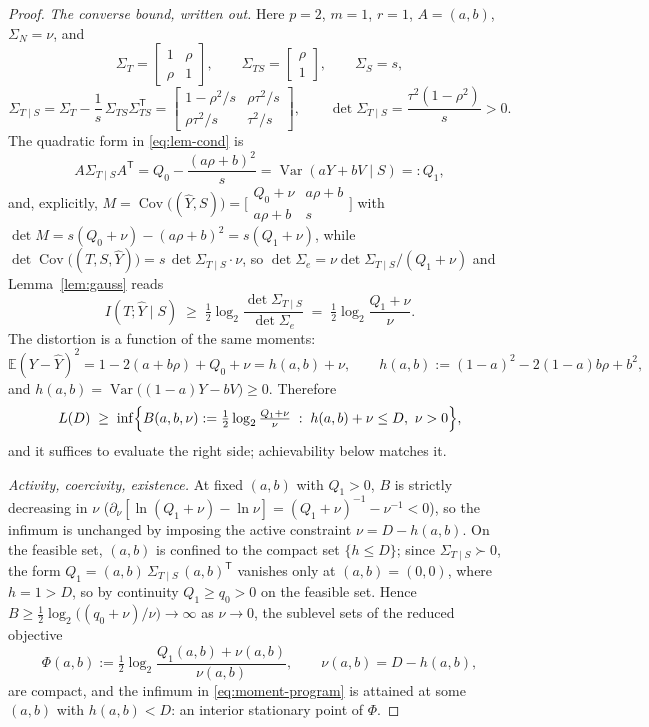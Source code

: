 ﻿\documentclass[11pt,onecolumn]{IEEEtran}
\newcommand{\E}{\mathbb{E}}
\newcommand{\Cov}{\operatorname{Cov}}
\newcommand{\hY}{\widehat{Y}}
\begin{document}
\begin{proof}
\emph{The converse bound, written out.} Here $p=2$, $m=1$, $r=1$,
$A=(a,b)$, $\Sigma_N=\nu$, and
\[
\Sigma_T=\begin{bmatrix}1&\rho\\ \rho&1\end{bmatrix},
\qquad
\Sigma_{TS}=\begin{bmatrix}\rho\\ 1\end{bmatrix},
\qquad
\Sigma_S=s,
\]
\[
\Sigma_{T\mid S}
=\Sigma_T-\frac1s\,\Sigma_{TS}\Sigma_{TS}^{\mathsf T}
=\begin{bmatrix}1-\rho^2/s&\rho\tau^2/s\\[2pt]
\rho\tau^2/s&\tau^2/s\end{bmatrix},
\qquad
\det\Sigma_{T\mid S}=\frac{\tau^2(1-\rho^2)}{s}>0 .
\]
The quadratic form in \eqref{eq:lem-cond} is
\[
A\Sigma_{T\mid S}A^{\mathsf T}
=Q_0-\frac{(a\rho+b)^2}{s}
=\operatorname{Var}(aY+bV\mid S)=:Q_1 ,
\]
and, explicitly, $M=\Cov\bigl((\hY,S)\bigr)=
\bigl[\begin{smallmatrix}Q_0+\nu&a\rho+b\\ a\rho+b&s\end{smallmatrix}\bigr]$
with $\det M=s(Q_0+\nu)-(a\rho+b)^2=s(Q_1+\nu)$, while
$\det\Cov\bigl((T,S,\hY)\bigr)=s\,\det\Sigma_{T\mid S}\cdot \nu$, so
$\det\Sigma_e=\nu\det\Sigma_{T\mid S}/(Q_1+\nu)$ and Lemma~\ref{lem:gauss}
reads
\begin{equation}
I(T;\hY\mid S)\;\ge\;
\tfrac12\log_2\frac{\det\Sigma_{T\mid S}}{\det\Sigma_e}
\;=\;\tfrac12\log_2\frac{Q_1+\nu}{\nu} .
\label{eq:scalar-detid}
\end{equation}
The distortion is a function of the same moments:
\begin{equation}
\E(Y-\hY)^2=1-2(a+b\rho)+Q_0+\nu=h(a,b)+\nu,
\qquad
h(a,b):=(1-a)^2-2(1-a)b\rho+b^2,
\label{eq:distortion}
\end{equation}
and $h(a,b)=\operatorname{Var}\bigl((1-a)Y-bV\bigr)\ge0$. Therefore
\begin{equation}
L(D)\;\ge\;
\inf\Bigl\{B(a,b,\nu):=\tfrac12\log_2\tfrac{Q_1+\nu}{\nu}
\;:\;h(a,b)+\nu\le D,\ \nu>0\Bigr\},
\label{eq:moment-program}
\end{equation}
and it suffices to evaluate the right side; achievability below
matches it.

\emph{Activity, coercivity, existence.} At fixed $(a,b)$ with $Q_1>0$,
$B$ is strictly decreasing in $\nu$
($\partial_\nu[\ln(Q_1+\nu)-\ln \nu]=(Q_1+\nu)^{-1}-\nu^{-1}<0$), so the infimum
is unchanged by imposing the active constraint $\nu=D-h(a,b)$. On the
feasible set, $(a,b)$ is confined to the compact set $\{h\le D\}$;
since $\Sigma_{T\mid S}\succ0$, the form
$Q_1=(a,b)\,\Sigma_{T\mid S}\,(a,b)^{\mathsf T}$ vanishes only at
$(a,b)=(0,0)$, where $h=1>D$, so by continuity $Q_1\ge q_0>0$ on the
feasible set. Hence $B\ge\tfrac12\log_2\bigl((q_0+\nu)/\nu\bigr)\to\infty$
as $\nu\to0$, the sublevel sets of the reduced objective
\[
\Phi(a,b):=\tfrac12\log_2\frac{Q_1(a,b)+\nu(a,b)}{\nu(a,b)},
\qquad \nu(a,b)=D-h(a,b),
\]
are compact, and the infimum in \eqref{eq:moment-program} is attained
at some $(a,b)$ with $h(a,b)<D$: an interior stationary point of
$\Phi$.


\end{proof}
\end{document}
